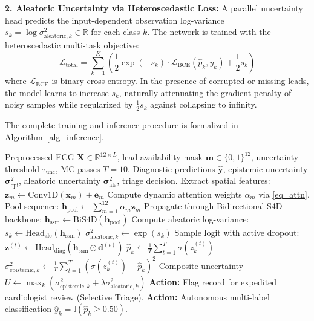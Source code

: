 \documentclass[journal]{IEEEtran}
\begin{document}
\textbf{2. Aleatoric Uncertainty via Heteroscedastic Loss:}
A parallel uncertainty head predicts the input-dependent observation log-variance $s_k = \log \sigma_{\text{aleatoric}, k}^2 \in \mathbb{R}$ for each class $k$. The network is trained with the heteroscedastic multi-task objective:
\begin{equation}
    \mathcal{L}_{\text{total}} = \sum_{k=1}^K \left( \frac{1}{2}\exp(-s_k) \cdot \mathcal{L}_{\text{BCE}}(\hat{p}_k, y_k) + \frac{1}{2} s_k \right)
\end{equation}
where $\mathcal{L}_{\text{BCE}}$ is binary cross-entropy. In the presence of corrupted or missing leads, the model learns to increase $s_k$, naturally attenuating the gradient penalty of noisy samples while regularized by $\frac{1}{2} s_k$ against collapsing to infinity.

The complete training and inference procedure is formalized in Algorithm~\ref{alg_inference}.

\begin{algorithm}[!t]
\caption{CardioLAC-SSM Dynamic Inference and Safe Selective Triage}
\label{alg_inference}
\begin{algorithmic}[1]
\REQUIRE Preprocessed ECG $\mathbf{X} \in \mathbb{R}^{12 \times L}$, lead availability mask $\mathbf{m} \in \{0, 1\}^{12}$, uncertainty threshold $\tau_{\text{unc}}$, MC passes $T=10$.
\ENSURE Diagnostic predictions $\hat{\mathbf{y}}$, epistemic uncertainty $\boldsymbol{\sigma}_{\text{epi}}^2$, aleatoric uncertainty $\boldsymbol{\sigma}_{\text{ale}}^2$, triage decision.
    \STATE Extract spatial features: $\mathbf{z}_m \leftarrow \text{Conv1D}(\mathbf{x}_m) + \mathbf{e}_m$
\ENDFOR
\STATE Compute dynamic attention weights $\alpha_m$ via \eqref{eq_attn}.
\STATE Pool sequence: $\mathbf{h}_{\text{pool}} \leftarrow \sum_{m=1}^{12} \alpha_m \mathbf{z}_m$
\STATE Propagate through Bidirectional S4D backbone: $\mathbf{h}_{\text{ssm}} \leftarrow \text{BiS4D}(\mathbf{h}_{\text{pool}})$
\STATE Compute aleatoric log-variance: $s_k \leftarrow \text{Head}_{\text{ale}}(\mathbf{h}_{\text{ssm}})$
\STATE $\sigma_{\text{aleatoric}, k}^2 \leftarrow \exp(s_k)$
    \STATE Sample logit with active dropout: $\mathbf{z}^{(t)} \leftarrow \text{Head}_{\text{diag}}(\mathbf{h}_{\text{ssm}} \odot \mathbf{d}^{(t)})$
\ENDFOR
\STATE $\hat{p}_k \leftarrow \frac{1}{T}\sum_{t=1}^T \sigma(z_k^{(t)})$
\STATE $\sigma_{\text{epistemic}, k}^2 \leftarrow \frac{1}{T}\sum_{t=1}^T (\sigma(z_k^{(t)}) - \hat{p}_k)^2$
\STATE Composite uncertainty $U \leftarrow \max_k (\sigma_{\text{epistemic}, k}^2 + \lambda \sigma_{\text{aleatoric}, k}^2)$
    \STATE \textbf{Action:} Flag record for expedited cardiologist review (Selective Triage).
\ELSE
    \STATE \textbf{Action:} Autonomous multi-label classification $\hat{y}_k = \mathbb{I}(\hat{p}_k \ge 0.50)$.
\ENDIF
\end{algorithmic}
\end{algorithm}
\end{document}
